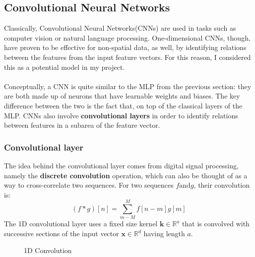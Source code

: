 	\subsection{Convolutional Neural Networks} 
	Classically, Convolutional Neural Networks(CNNs) are used in tasks such as computer vision or natural language processing. One-dimensional CNNs, though, have proven to be effective for non-spatial data, as well, by identifying relations between the features from the input feature vectors. For this reason, I considered this as a potential model in my project. 
	\\ \\
	Conceptually, a CNN is quite similar to the MLP from the previous section: they are both made up of neurons that have learnable weights and biases. The key difference between the two is the fact that, on top of the classical layers of the MLP. CNNs also involve \textbf{convolutional layers} in order to identify relations between features in a subarea of the feature vector. 
	
	\subsubsection*{Convolutional layer}
	The idea behind the convolutional layer comes from digital signal processing, namely the \textbf{discrete convolution} operation, which can also be thought of as a way to cross-correlate two sequences. For two sequences $f \text{and} g$, their convolution is:
	\begin{equation}
		(f*g)[n] = \sum_{m-M}^{M} f[n-m] g[m]
	\end{equation}
	The 1D convolutional layer uses a fixed size kernel $\mathbf{k} \in \mathbb{R}^a$ that is convolved with successive sections of the input vector $\mathbf{x}\in\mathbb{R}^d$ having length $a$. 
	\begin{figure}[H]
		\centering
		\caption{1D Convolution}
		\label{Fig: prep/ml/cnn/convoLayer}
	\end{figure}
